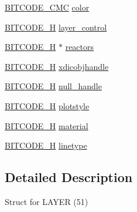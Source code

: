 \begin{DoxyCompactItemize}
\item 
\hyperlink{dwg_8h_add86ce54dd5e62c8f7f5a870b467919a}{\-B\-I\-T\-C\-O\-D\-E\-\_\-\-C\-M\-C} \hyperlink{struct__dwg__object__LAYER_a99f29b1745a2e90dfa9ce885277a1f8c}{color}
\item 
\hyperlink{dwg_8h_a7c700e94e047a97ba8c24bdfe4029dc3}{\-B\-I\-T\-C\-O\-D\-E\-\_\-\-H} \hyperlink{struct__dwg__object__LAYER_ae4c00b5cfcbe093d45290e601007e445}{layer\-\_\-control}
\item 
\hyperlink{dwg_8h_a7c700e94e047a97ba8c24bdfe4029dc3}{\-B\-I\-T\-C\-O\-D\-E\-\_\-\-H} $\ast$ \hyperlink{struct__dwg__object__LAYER_a7df74a578fcc9dccd1b82b4d2216a531}{reactors}
\item 
\hyperlink{dwg_8h_a7c700e94e047a97ba8c24bdfe4029dc3}{\-B\-I\-T\-C\-O\-D\-E\-\_\-\-H} \hyperlink{struct__dwg__object__LAYER_a3b98f93b7420d0bc440a6d26660f7a94}{xdicobjhandle}
\item 
\hyperlink{dwg_8h_a7c700e94e047a97ba8c24bdfe4029dc3}{\-B\-I\-T\-C\-O\-D\-E\-\_\-\-H} \hyperlink{struct__dwg__object__LAYER_a7ff794d7e9917d3ce4a022ae94b01f4e}{null\-\_\-handle}
\item 
\hyperlink{dwg_8h_a7c700e94e047a97ba8c24bdfe4029dc3}{\-B\-I\-T\-C\-O\-D\-E\-\_\-\-H} \hyperlink{struct__dwg__object__LAYER_a89e2c422552c13a3d8206d38480a6d5a}{plotstyle}
\item 
\hyperlink{dwg_8h_a7c700e94e047a97ba8c24bdfe4029dc3}{\-B\-I\-T\-C\-O\-D\-E\-\_\-\-H} \hyperlink{struct__dwg__object__LAYER_a89117de541f3da17fa406c67e4b9d5b8}{material}
\item 
\hyperlink{dwg_8h_a7c700e94e047a97ba8c24bdfe4029dc3}{\-B\-I\-T\-C\-O\-D\-E\-\_\-\-H} \hyperlink{struct__dwg__object__LAYER_a27fb367469cff2cf7837ffef2f5896c9}{linetype}
\end{DoxyCompactItemize}


\subsection{\-Detailed \-Description}
\-Struct for \-L\-A\-Y\-E\-R (51) 

